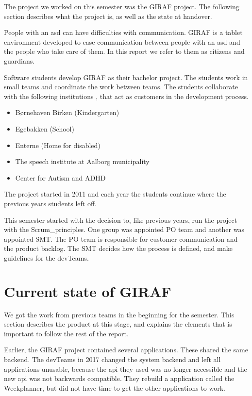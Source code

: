 The project we worked on this semester was the GIRAF project. The following section describes what the project is, as well as the state at handover.

People with an \gls{asd} can have difficulties with communication. GIRAF is a tablet environment developed to ease communication between people with an \gls{asd} and the people who take care of them. In this report we refer to them as \glspl{citizen} and \glspl{guardian}.

Software students develop GIRAF as their bachelor project. The students work in small teams and coordinate the work between teams. The students collaborate with the following institutions \cite{GirafWebsite}, that act as customers in the development process.

\begin{itemize}
    \item Børnehaven Birken (Kindergarten) \cite{bhBirken}
    \item Egebakken (School) \cite{egebakken}
    \item Enterne (Home for disabled) \cite{enterne}
    \item The speech institute at Aalborg municipality
    \item Center for Autism and ADHD \cite{center_for_autism}
\end{itemize}

The project started in 2011 and each year the students continue where the previous years students left off.

This semester started with the decision to, like previous years, run the project with the \gls{Scrum_principles}. One group was appointed \gls{PO} team and another was appointed \gls{SMT}. The \gls{PO} team is responsible for customer communication and the product backlog. The \gls{SMT} decides how the process is defined, and make guidelines for the \glspl{devTeam}.

\section{Current state of GIRAF}

We got the work from previous teams in the beginning for the semester. This section describes the product at this stage, and explains the elements that is important to follow the rest of the report.

Earlier, the GIRAF project contained several applications. These shared the same backend. The \glspl{devTeam} in 2017 changed the system backend\cite{SW608F18} and left all applications unusable, because the \gls{api} they used was no longer accessible and the new \gls{api} was not backwards compatible. They rebuild a application called the Weekplanner, but did not have time to get the other applications to work. 

